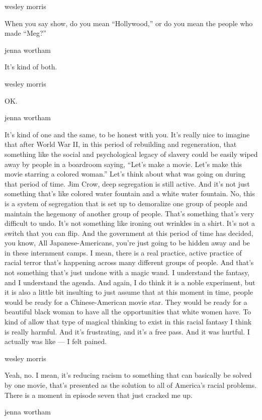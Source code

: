 wesley morris

When you say show, do you mean ``Hollywood,'' or do you mean the people
who made ``Meg?''

jenna wortham

It's kind of both.

wesley morris

OK.

jenna wortham

It's kind of one and the same, to be honest with you. It's really nice
to imagine that after World War II, in this period of rebuilding and
regeneration, that something like the social and psychological legacy of
slavery could be easily wiped away by people in a boardroom saying,
``Let's make a movie. Let's make this movie starring a colored woman.''
Let's think about what was going on during that period of time. Jim
Crow, deep segregation is still active. And it's not just something
that's like colored water fountain and a white water fountain. No, this
is a system of segregation that is set up to demoralize one group of
people and maintain the hegemony of another group of people. That's
something that's very difficult to undo. It's not something like ironing
out wrinkles in a shirt. It's not a switch that you can flip. And the
government at this period of time has decided, you know, All
Japanese-Americans, you're just going to be hidden away and be in these
internment camps. I mean, there is a real practice, active practice of
racial terror that's happening across many different groups of people.
And that's not something that's just undone with a magic wand. I
understand the fantasy, and I understand the agenda. And again, I do
think it is a noble experiment, but it is also a little bit insulting to
just assume that at this moment in time, people would be ready for a
Chinese-American movie star. They would be ready for a beautiful black
woman to have all the opportunities that white women have. To kind of
allow that type of magical thinking to exist in this racial fantasy I
think is really harmful. And it's frustrating, and it's a free pass. And
it was hurtful. I actually was like --- I felt pained.

wesley morris

Yeah, no. I mean, it's reducing racism to something that can basically
be solved by one movie, that's presented as the solution to all of
America's racial problems. There is a moment in episode seven that just
cracked me up.

jenna wortham

